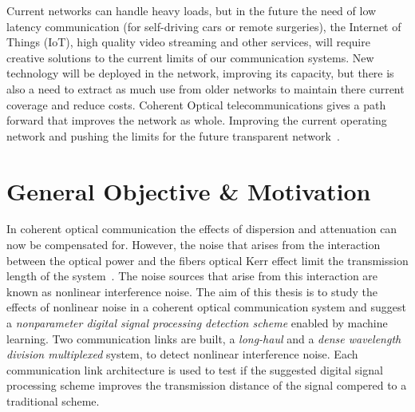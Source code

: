 Current networks can handle heavy loads, but in the future the need of low latency communication (for self-driving cars or remote surgeries), the Internet of Things (IoT), high quality video streaming and other services, will require creative solutions to the current limits of our communication systems.  New technology will be deployed in the network, improving its capacity, but there is also a need to extract as much use from older networks to maintain there current coverage and reduce costs. Coherent Optical telecommunications gives a path forward that improves the network as whole. Improving the current operating network and pushing the limits for the future transparent network~\cite{ModForm,NetGenTransp}.

\section{General Objective \& Motivation}	
In coherent optical communication the effects of dispersion and attenuation can now be compensated for. However, the noise that arises from the interaction between the optical power and the fibers optical Kerr effect limit the transmission length of the system~\cite{NLPNinCFO}. The noise sources that arise from this interaction are known as nonlinear interference noise. The aim of this thesis is to study the effects of nonlinear noise in a coherent optical communication system and suggest a \textit{nonparameter digital signal processing detection scheme} enabled by machine learning. Two communication links are built, a \textit{long-haul} and a \textit{dense wavelength division multiplexed} system, to detect nonlinear interference noise. Each communication link architecture is used to test if the suggested digital signal processing scheme improves the transmission distance of the signal compered to a  traditional scheme.    



